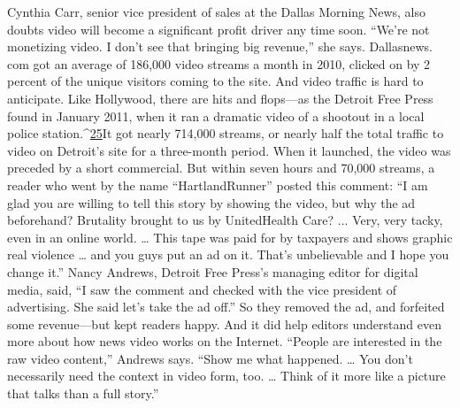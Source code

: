Cynthia Carr, senior vice president of sales at the Dallas Morning News, also
doubts video will become a significant profit driver any time soon. ``We're not
monetizing video. I don't see that bringing big revenue,'' she says. Dallasnews.
com got an average of 186,000 video streams a month in 2010, clicked on by 2
percent of the unique visitors coming to the site.
And video traffic is hard to anticipate. Like Hollywood, there are hits and
flops—as the Detroit Free Press found in January 2011, when it ran a dramatic
video of a shootout in a local police station.^{\href{#endnotes-chapter-4}{25}}It got nearly 714,000 streams, or
nearly half the total traffic to video on Detroit's site for a three-month period.
When it launched, the video was preceded by a short commercial. But within
seven hours and 70,000 streams, a reader who went by the name ``HartlandRunner''
posted this comment: ``I am glad you are willing to tell this story by showing
the video, but why the ad beforehand? Brutality brought to us by UnitedHealth
Care? ... Very, very tacky, even in an online world. … This tape was paid for by
taxpayers and shows graphic real violence … and you guys put an ad on it. That's
unbelievable and I hope you change it.''
Nancy Andrews, Detroit Free Press's managing editor for digital media, said, ``I
saw the comment and checked with the vice president of advertising. She said
let's take the ad off.'' So they removed the ad, and forfeited some revenue—but
kept readers happy. And it did help editors understand even more about how
news video works on the Internet. ``People are interested in the raw video content,''
Andrews says. ``Show me what happened. … You don't necessarily need the
context in video form, too. … Think of it more like a picture that talks than a
full story.''



